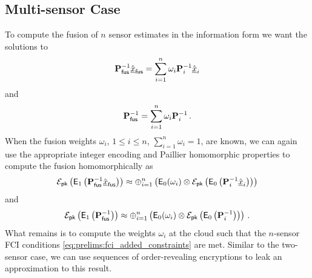 % 
% 

\subsection{Multi-sensor Case}\label{subsec:cloud_fusion:secfci_nsen}
To compute the fusion of $n$ sensor estimates in the information form we want the solutions to
\begin{equation}
    {\ensuremath{{\mathbf{P}}}}_{\mathsf{fus}}^{-1}\hat{{\underline{x}}}_{\mathsf{fus}} = \sum_{i=1}^n\omega_i{{\mathbf{P}}}_i^{-1}\hat{{\underline{x}}}_i
\end{equation}
and
\begin{equation}
    {\ensuremath{{\mathbf{P}}}}_{\mathsf{fus}}^{-1} = \sum_{i=1}^n\omega_i{{\mathbf{P}}}_i^{-1}\,.
\end{equation}
When the fusion weights $\omega_i$, $1\leq i\leq n$, $\sum_{i=1}^n\omega_i=1$, are known, we can again use the appropriate integer encoding and Paillier homomorphic properties to compute the fusion homomorphically as
\begin{equation}\label{eq:cloud_fusion:secfci_nsen_paillier_fuse_ests}
    \mathcal{E}_{\mathsf{pk}}\left(\mathsf{E}_1\left({{\mathbf{P}}}_{\mathsf{fus}}^{-1}\hat{{\underline{x}}}_{\mathsf{fus}}\right)\right) \approx \oplus_{i=1}^n\left(\mathsf{E}_0(\omega_i)\otimes\mathcal{E}_{\mathsf{pk}}\left(\mathsf{E}_0\left({{\mathbf{P}}}^{-1}_i\hat{{\underline{x}}}_i\right)\right)\right)
\end{equation}
and
\begin{equation}\label{eq:cloud_fusion:secfci_nsen_paillier_fuse_covs}
    \mathcal{E}_{\mathsf{pk}}\left(\mathsf{E}_1\left({{\mathbf{P}}}_{\mathsf{fus}}^{-1}\right)\right) \approx \oplus_{i=1}^n\left(\mathsf{E}_0(\omega_i)\otimes\mathcal{E}_{\mathsf{pk}}\left(\mathsf{E}_0\left({{\mathbf{P}}}^{-1}_i\right)\right)\right)\,.
\end{equation}
What remains is to compute the weights $\omega_i$ at the cloud such that the $n$-sensor FCI conditions \eqref{eq:prelims:fci_added_constraints} are met. Similar to the two-sensor case, we can use sequences of order-revealing encryptions to leak an approximation to this result. 

